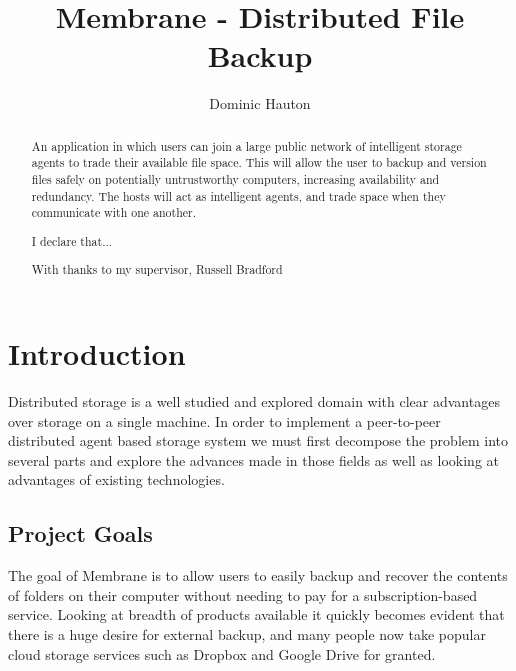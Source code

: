 \documentclass[11pt, a4paper, twocolumn, twoside]{report}
\title{Membrane - Distributed File Backup}
\author{Dominic Hauton}
\begin{document}
\maketitle


\begin{abstract}
An application in which users can join a large public network of intelligent storage agents to trade their available file space. This will allow the user to backup and version files safely on potentially untrustworthy computers, increasing availability and redundancy. The hosts will act as intelligent agents, and trade space when they communicate with one another.
\end{abstract}

\renewcommand{\abstractname}{Declaration}
\begin{abstract}
\hfil I declare that... \hfil
\end{abstract}

\renewcommand{\abstractname}{Acknowledgements}
\begin{abstract}
\hfil With thanks to my supervisor, Russell Bradford \hfil
\end{abstract}

\tableofcontents

\listoffigures

\chapter{Introduction}
Distributed storage is a well studied and explored domain with clear advantages over storage on a single machine. In order to implement a peer-to-peer distributed agent based storage system we must first decompose the problem into several parts and explore the advances made in those fields as well as looking at advantages of existing technologies.

\section{Project Goals}

The goal of Membrane is to allow users to easily backup and recover the contents of folders on their computer without needing to pay for a subscription-based service. Looking at breadth of products available it quickly becomes evident that there is a huge desire for external backup, and many people now take popular cloud storage services such as Dropbox and Google Drive for granted. \citep{dropbox2015popularity}
\end{document}
